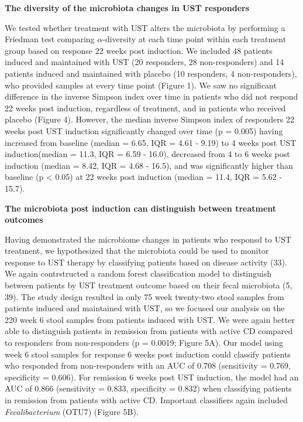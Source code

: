 \documentclass[11pt,]{article}
\begin{document}
\textbf{The diversity of the microbiota changes in UST responders}

We tested whether treatment with UST alters the microbiota by performing
a Friedman test comparing \({\alpha}\)-diversity at each time point
within each treatment group based on response 22 weeks post induction.
We included 48 patients induced and maintained with UST (20 responders,
28 non-responders) and 14 patients induced and maintained with placebo
(10 responders, 4 non-responders), who provided samples at every time
point (Figure 1). We saw no significant difference in the inverse
Simpson index over time in patients who did not respond 22 weeks post
induction, regardless of treatment, and in patients who received placebo
(Figure 4). However, the median inverse Simpson index of responders 22
weeks post UST induction significantly changed over time (p = 0.005)
having increased from baseline (median = 6.65, IQR = 4.61 - 9.19) to 4
weeks post UST induction(median = 11.3, IQR = 6.59 - 16.0), decreased
from 4 to 6 weeks post induction (median = 8.42, IQR = 4.68 - 16.5), and
was significantly higher than baseline (p \textless{} 0.05) at 22 weeks
post induction (median = 11.4, IQR = 5.62 - 15.7).

\textbf{The microbiota post induction can distinguish between treatment
outcomes}

Having demonstrated the microbiome changes in patients who responsd to
UST treatment, we hypothesized that the microbiota could be used to
monitor response to UST therapy by classifying patients based on disease
activity (33). We again contrstructed a random forest classification
model to distinguish between patients by UST treatment outcome based on
their fecal microbiota (5, 39). The study design resulted in only 75
week twenty-two stool samples from patients induced and maintained with
UST, so we focused our analysis on the 220 week 6 stool samples from
patients induced with UST. We were again better able to distinguish
patients in remission from patients with active CD compared to
responders from non-responders (p = 0.0019; Figure 5A). Our model using
week 6 stool samples for response 6 weeks post induction could classify
patients who responded from non-responders with an AUC of 0.708
(sensitivity = 0.769, specificity = 0.606). For remission 6 weeks post
UST induction, the model had an AUC of 0.866 (sensitivity = 0.833,
specificity = 0.832) when classifying patients in remission from
patients with active CD. Important classifiers again included
\emph{Fecalibacterium} (OTU7) (Figure 5B).
\end{document}

